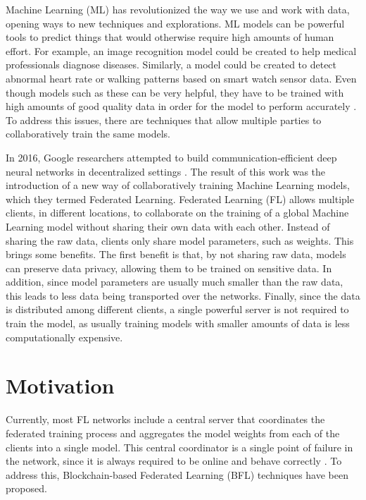 Machine Learning (ML) has revolutionized the way we use and work with data, opening ways to new techniques and explorations. ML models can be powerful tools to predict things that would otherwise require high amounts of human effort. For example, an image recognition model could be created to help medical professionals diagnose diseases. Similarly, a model could be created to detect abnormal heart rate or walking patterns based on smart watch sensor data. Even though models such as these can be very helpful, they have to be trained with high amounts of good quality data in order for the model to perform accurately \cite{10.1145/3394486.3406477}. To address this issues, there are techniques that allow multiple parties to collaboratively train the same models.

In 2016, Google researchers attempted to build communication-efficient deep neural networks in decentralized settings \cite{10.48550/arxiv.1602.05629}. The result of this work was the introduction of a new way of collaboratively training Machine Learning models, which they termed Federated Learning. Federated Learning (FL) allows multiple clients, in different locations, to collaborate on the training of a global Machine Learning model without sharing their own data with each other. Instead of sharing the raw data, clients only share model parameters, such as weights. This brings some benefits. The first benefit is that, by not sharing raw data, models can preserve data privacy, allowing them to be trained on sensitive data. In addition, since model parameters are usually much smaller than the raw data, this leads to less data being transported over the networks. Finally, since the data is distributed among different clients, a single powerful server is not required to train the model, as usually training models with smaller amounts of data is less computationally expensive.

\section{Motivation}\label{intro:motivation}

Currently, most FL networks include a central server that coordinates the federated training process and aggregates the model weights from each of the clients into a single model. This central coordinator is a single point of failure in the network, since it is always required to be online and behave correctly \cite{li_blockchain_2021, 10.48550/arxiv.2110.02182}. To address this, Blockchain-based Federated Learning (BFL) techniques have been proposed.

